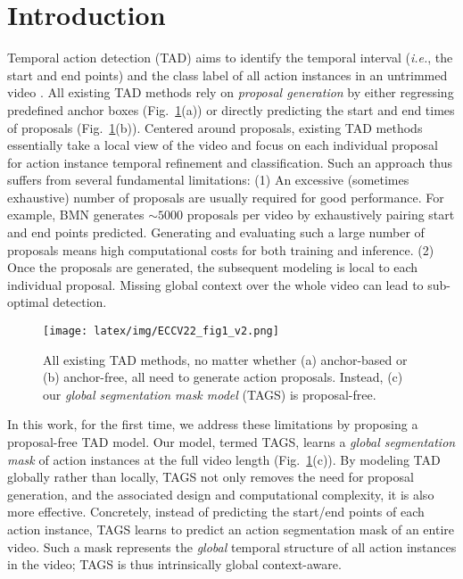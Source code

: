\documentclass[runningheads]{llncs}
\newcommand{\ie}{\textit{i.e.}}
\newcommand{\shortmodelname}{TAGS}
\begin{document}
\section{Introduction}
\label{sec:intro}
Temporal action detection (TAD) aims to identify the temporal interval (\ie, the start and end points) and the class label of all action instances in an untrimmed video \cite{idrees2017thumos,caba2015activitynet}. 
All existing TAD methods 
rely on {\em proposal generation} by either 
regressing predefined anchor boxes 
\cite{xu2017r,chao2018rethinking,gao2017turn,long2019gaussian}
(Fig.~\ref{fig:design}(a))
or 
directly predicting the start and end times of proposals
\cite{lin2019bmn,buch2017sst,lin2018bsn,xu2020g,nag2021few,xu2021boundary,xu2021low}
(Fig.~\ref{fig:design}(b)).
Centered around proposals, existing TAD methods essentially take a local view of the video and focus on each individual proposal for action instance temporal refinement and classification. Such an approach thus
suffers from
several fundamental limitations:
{(1)} An excessive (sometimes exhaustive) number of proposals are usually required
for good performance.
For example, BMN \cite{lin2019bmn} generates $\sim 5000$ proposals per video
by exhaustively pairing start and end points predicted. Generating and evaluating such a large number of proposals means high computational costs for both training and inference.
{(2)}  Once the proposals are generated, the subsequent modeling is local to each individual proposal. Missing global context over the whole video can lead to sub-optimal detection. 

\begin{figure}[!t]
\begin{center}
  \texttt{[image: latex/img/ECCV22\_fig1\_v2.png]}
\end{center}
\caption{All existing TAD methods,  no matter whether (a) anchor-based or (b) anchor-free,  all
need to generate action proposals.
Instead, (c) our {\em global segmentation mask model} ({\shortmodelname}) is proposal-free.
}
\label{fig:design}
\end{figure}


In this work, for the first time, we address these limitations by proposing a proposal-free  TAD model. Our model, termed {\shortmodelname},  learns  a {\em global segmentation mask} of action instances at the full video length (Fig.~\ref{fig:design}(c)). By modeling TAD globally rather than locally, {\shortmodelname} not only removes the need for proposal generation, and the associated design and computational complexity, it is also more effective.  
Concretely, 
instead of predicting the start/end points of each action instance,
{\shortmodelname} learns to predict an action segmentation mask of an entire video. Such a mask represents the {\em global} temporal structure of all action instances in the video; {\shortmodelname} is thus intrinsically global context-aware. 
\end{document}
